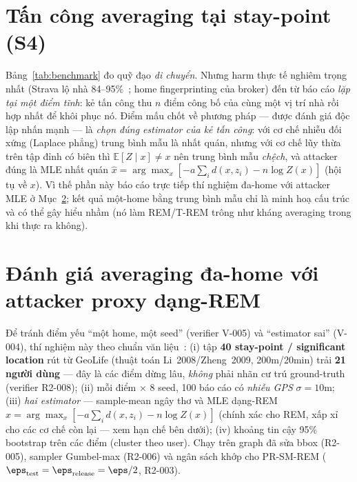 \section{Tấn công averaging tại stay-point (S4)}
\label{sec:averaging}

Bảng~\ref{tab:benchmark} đo quỹ đạo \emph{di chuyển}. Nhưng harm thực tế nghiêm
trọng nhất (Strava lộ nhà 84--95\%~\cite{hassan2018run}; home fingerprinting của
broker) đến từ báo cáo \emph{lặp tại một điểm tĩnh}: kẻ tấn công thu $n$ điểm công
bố của cùng một vị trí nhà rồi hợp nhất để khôi phục nó. Điểm mấu chốt về phương
pháp --- được đánh giá độc lập nhấn mạnh --- là \emph{chọn đúng estimator của kẻ
tấn công}: với cơ chế nhiễu đối xứng (Laplace phẳng) trung bình mẫu là nhất quán,
nhưng với cơ chế lũy thừa trên tập đỉnh có biên thì $\mathbb{E}[Z\mid x]\ne x$ nên
trung bình mẫu \emph{chệch}, và attacker đúng là MLE nhất quán
$\hat x=\arg\max_x[-a\sum_i d(x,z_i)-n\log Z(x)]$ (hội tụ về $x$). Vì thế phần này
báo cáo trực tiếp thí nghiệm đa-home với attacker MLE ở Mục~\ref{sec:averaging-multi};
kết quả một-home bằng trung bình mẫu chỉ là minh hoạ cấu trúc và có thể gây hiểu
nhầm (nó làm REM/T-REM trông như kháng averaging trong khi thực ra không).

\section{Đánh giá averaging đa-home với attacker proxy dạng-REM}
\label{sec:averaging-multi}

Để tránh điểm yếu ``một home, một seed'' (verifier V-005) và ``estimator sai''
(V-004), thí nghiệm này theo chuẩn văn liệu~\cite{shokri2011quantifying,
dhondt2022run}: (i) tập \textbf{40 stay-point / significant location} rút từ
GeoLife (thuật toán Li~2008/Zheng~2009, 200m/20min) trải \textbf{21 người dùng}
--- đây là các điểm dừng lâu, \emph{không} phải nhãn cư trú ground-truth (verifier
R2-008); (ii) mỗi điểm $\times$ 8 seed, 100 báo cáo có \emph{nhiễu GPS}
$\sigma=10$m; (iii) \emph{hai estimator} --- sample-mean ngây thơ và MLE dạng-REM
$\hat x=\arg\max_x[-a\sum_i d(x,z_i) - n\log Z(x)]$ (chính xác cho REM, xấp xỉ cho
các cơ chế còn lại --- xem hạn chế bên dưới); (iv) khoảng tin cậy 95\% bootstrap
trên các điểm (cluster theo user). Chạy trên graph đã sửa bbox (R2-005), sampler
Gumbel-max (R2-006) và ngân sách khớp cho PR-SM-REM ($\eps_{\text{test}}=
\eps_{\text{release}}=\eps/2$, R2-003).

